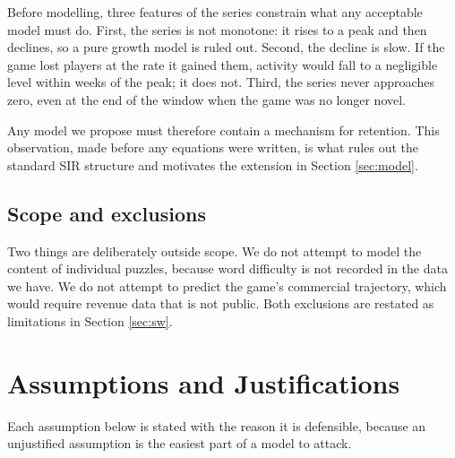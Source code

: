 \documentclass[12pt]{article}
\begin{document}
Before modelling, three features of the series constrain what any acceptable
model must do. First, the series is not monotone: it rises to a peak and then
declines, so a pure growth model is ruled out. Second, the decline is slow. If
the game lost players at the rate it gained them, activity would fall to a
negligible level within weeks of the peak; it does not. Third, the series never
approaches zero, even at the end of the window when the game was no longer
novel.

Any model we propose must therefore contain a mechanism for retention. This
observation, made before any equations were written, is what rules out the
standard SIR structure and motivates the extension in
Section \ref{sec:model}.

\subsection{Scope and exclusions}

Two things are deliberately outside scope. We do not attempt to model the
content of individual puzzles, because word difficulty is not recorded in the
data we have. We do not attempt to predict the game's commercial trajectory,
which would require revenue data that is not public. Both exclusions are
restated as limitations in Section \ref{sec:sw}.

\section{Assumptions and Justifications}\label{sec:SEC-030}
Each assumption below is stated with the reason it is defensible, because an
unjustified assumption is the easiest part of a model to attack.
\end{document}
